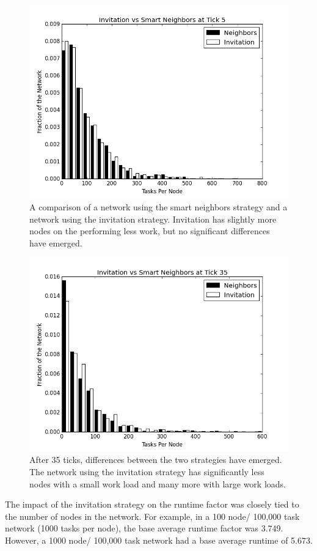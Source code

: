 \documentclass[11pt,conference]{IEEEtran}
\begin{document}
{	
	
	\begin{figure}
		\centering
		\includegraphics[width=0.7\linewidth]{figs/inviteNeighborsHist5}
		\caption[Invitation  vs smart neighbor injection after 5 ticks.]{A comparison of a network using the smart neighbors strategy and a network using the invitation strategy.  Invitation has slightly more nodes on the performing less work, but no significant differences have emerged.}
		\label{fig:inviteNeighborsHist5}
	\end{figure}
	
	
	\begin{figure}
		\centering
		\includegraphics[width=0.7\linewidth]{figs/inviteNeighborsHist35}
		\caption[Invitation vs smart neighbor injection after 35 ticks.]{After 35 ticks, differences between the two strategies have emerged.  The network using the invitation strategy has significantly less nodes with a small work load and many more with large work loads.}
		\label{fig:inviteNeighborsHist35}
	\end{figure}
	
	
	
	The impact of the invitation strategy on the runtime factor was closely tied to the number of nodes in the network.
	For example, in a 100 node/ 100,000 task network (1000 tasks per node), the base average runtime factor was 3.749.
	However, a 1000 node/ 100,000 task network had a base average runtime of 5.673.
	
}
\end{document}
